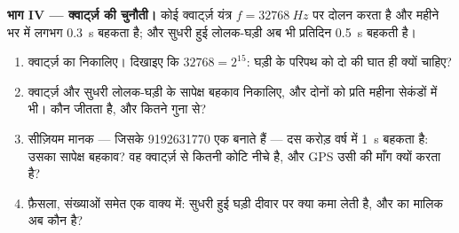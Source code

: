 \begin{problem}
\medskip
\noindent\textbf{भाग IV --- क्वार्ट्ज़ की चुनौती।} कोई क्वार्ट्ज़ यंत्र $f = \qty{32768}{Hz}$
पर दोलन करता है और महीने भर में लगभग \qty{0.3}{s} बहकता है; और सुधरी हुई लोलक-घड़ी
अब भी प्रतिदिन \qty{0.5}{s} बहकती है।
\begin{enumerate}[resume]
  \item क्वार्ट्ज़ का  निकालिए। दिखाइए कि $\num{32768} = 2^{15}$: घड़ी के
        परिपथ को दो की घात ही क्यों चाहिए?
  \item क्वार्ट्ज़ और सुधरी लोलक-घड़ी के सापेक्ष बहकाव निकालिए, और दोनों को
        प्रति महीना सेकंडों में भी। कौन जीतता है, और कितने गुना से?
  \item सीज़ियम मानक --- जिसके \num{9192631770}  एक  बनाते हैं ---
        दस करोड़ वर्ष में \qty{1}{s} बहकता है: उसका सापेक्ष बहकाव? वह क्वार्ट्ज़
        से कितनी कोटि नीचे है, और GPS उसी की माँग क्यों करता है?
  \item फ़ैसला, संख्याओं समेत एक वाक्य में: सुधरी हुई घड़ी दीवार पर क्या कमा
        लेती है, और  का मालिक अब कौन है?
\end{enumerate}
\end{problem}
